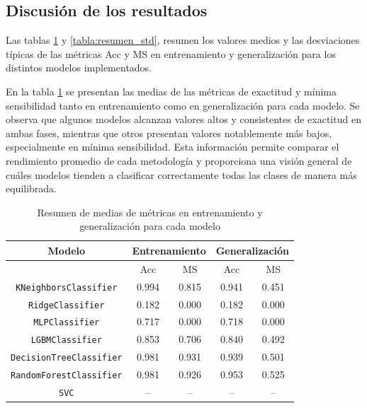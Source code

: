 \subsection{Discusión de los resultados}
\label{subsec:discusion_multi}

Las tablas \ref{tabla:resumen_mean} y \ref{tabla:resumen_std}, resumen los valores medios y las desviaciones típicas de las métricas Acc y MS en entrenamiento y generalización para los distintos modelos implementados.

\vspace{1em}

En la tabla \ref{tabla:resumen_mean} se presentan las medias de las métricas de exactitud y mínima sensibilidad tanto en entrenamiento como en generalización para cada modelo. Se observa que algunos modelos alcanzan valores altos y consistentes de exactitud en ambas fases, mientras que otros presentan valores notablemente más bajos, especialmente en mínima sensibilidad. Esta información permite comparar el rendimiento promedio de cada metodología y proporciona una visión general de cuáles modelos tienden a clasificar correctamente todas las clases de manera más equilibrada.

\begin{table}[H]
	\centering
	\begin{tabular}{|c|c|c|c|c|}
		\hline
		\rowcolor{LightCyan}
		Modelo & \multicolumn{2}{c|}{Entrenamiento} & \multicolumn{2}{c|}{Generalización} \\
		\hline
		\rowcolor{LightCyan}
		& Acc & MS & Acc & MS \\
		\hline
		\texttt{KNeighborsClassifier}   & 0.994 & 0.815 & 0.941 & 0.451 \\
		\texttt{RidgeClassifier}        & 0.182 & 0.000 & 0.182 & 0.000 \\
		\texttt{MLPClassifier}          & 0.717 & 0.000 & 0.718 & 0.000 \\
		\texttt{LGBMClassifier}         & 0.853 & 0.706 & 0.840 & 0.492 \\
		\texttt{DecisionTreeClassifier} & 0.981 & 0.931 & 0.939 & 0.501 \\
		\texttt{RandomForestClassifier} & 0.981 & 0.926 & 0.953 & 0.525 \\
		\texttt{SVC}                    & --    & --    & --    & --    \\
		\hline
	\end{tabular}
	\caption{Resumen de medias de métricas en entrenamiento y generalización para cada modelo}
	\label{tabla:resumen_mean}
\end{table}

